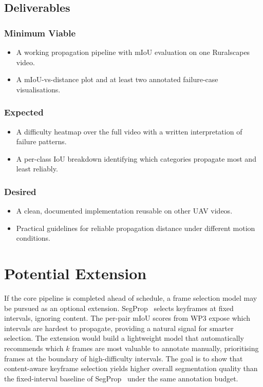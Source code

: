 \documentclass[rnd]{mas_proposal}
\begin{document}
\subsection{Deliverables}

\subsubsection*{Minimum Viable}
\begin{itemize}
    \item A working propagation pipeline with mIoU evaluation on one
    Ruralscapes video.
    \item A mIoU-vs-distance plot and at least two annotated failure-case
    visualisations.
\end{itemize}

\subsubsection*{Expected}
\begin{itemize}
    \item A difficulty heatmap over the full video with a written
    interpretation of failure patterns.
    \item A per-class IoU breakdown identifying which categories propagate
    most and least reliably.
\end{itemize}

\subsubsection*{Desired}
\begin{itemize}
    \item A clean, documented implementation reusable on other UAV videos.
    \item Practical guidelines for reliable propagation distance under
    different motion conditions.
\end{itemize}



\section{Potential Extension}

If the core pipeline is completed ahead of schedule, a frame selection model
may be pursued as an optional extension. SegProp~\cite{segprop2020} selects
keyframes at fixed intervals, ignoring content. The per-pair mIoU scores from
WP3 expose which intervals are hardest to propagate, providing a natural
signal for smarter selection. The extension would build a lightweight model
that automatically recommends which $k$ frames are most valuable to annotate
manually, prioritising frames at the boundary of high-difficulty intervals.
The goal is to show that content-aware keyframe selection yields higher overall
segmentation quality than the fixed-interval baseline of
SegProp~\cite{segprop2020} under the same annotation budget.

\nocite{*}



\end{document}
